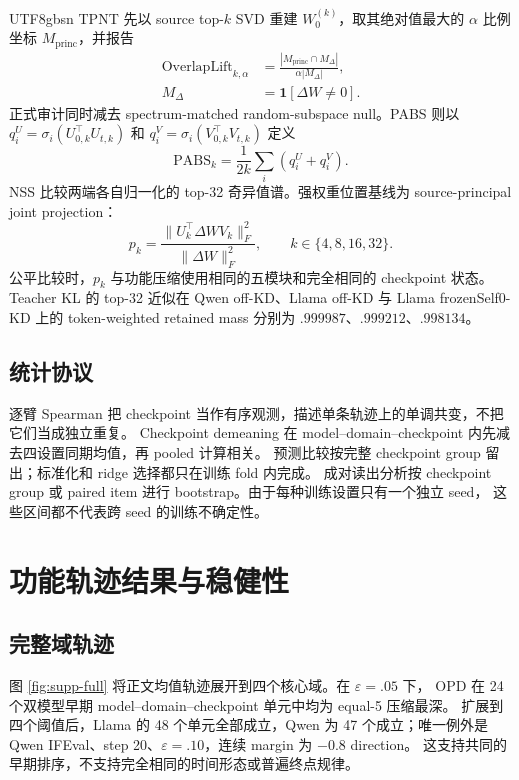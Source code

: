 \documentclass[letterpaper]{article} %
\begin{document}
\begin{CJK*}{UTF8}{gbsn}
TPNT 先以 source top-$k$ SVD 重建 $W_0^{(k)}$，取其绝对值最大的 $\alpha$ 比例坐标
$M_{\mathrm{princ}}$，并报告
\begin{equation}
\begin{aligned}
\mathrm{OverlapLift}_{k,\alpha}
&=\frac{|M_{\mathrm{princ}}\cap M_\Delta|}{\alpha|M_\Delta|},\\
M_\Delta&=\mathbf1[\Delta W\ne0].
\end{aligned}
\end{equation}
正式审计同时减去 spectrum-matched random-subspace null。PABS 则以
$q_i^U=\sigma_i(U_{0,k}^\top U_{t,k})$ 和
$q_i^V=\sigma_i(V_{0,k}^\top V_{t,k})$ 定义
\begin{equation}
\mathrm{PABS}_k=\frac{1}{2k}\sum_i(q_i^U+q_i^V).
\end{equation}
NSS 比较两端各自归一化的 top-32 奇异值谱。强权重位置基线为
source-principal joint projection：
\begin{equation}
p_k=\frac{\|U_k^\top\Delta W V_k\|_F^2}{\|\Delta W\|_F^2},
\qquad k\in\{4,8,16,32\}.
\end{equation}
公平比较时，$p_k$ 与功能压缩使用相同的五模块和完全相同的 checkpoint 状态。
Teacher KL 的 top-32 近似在 Qwen off-KD、Llama off-KD 与 Llama frozenSelf0-KD
上的 token-weighted retained mass 分别为 $.999987$、$.999212$、$.998134$。

\subsection{统计协议}

逐臂 Spearman 把 checkpoint 当作有序观测，描述单条轨迹上的单调共变，不把它们当成独立重复。
Checkpoint demeaning 在 model--domain--checkpoint 内先减去四设置同期均值，再 pooled 计算相关。
预测比较按完整 checkpoint group 留出；标准化和 ridge 选择都只在训练 fold 内完成。
成对读出分析按 checkpoint group 或 paired item 进行 bootstrap。由于每种训练设置只有一个独立 seed，
这些区间都不代表跨 seed 的训练不确定性。

\section{功能轨迹结果与稳健性}

\subsection{完整域轨迹}

图 \ref{fig:supp-full} 将正文均值轨迹展开到四个核心域。在 $\varepsilon=.05$ 下，
OPD 在 24 个双模型早期 model--domain--checkpoint 单元中均为 equal-5 压缩最深。
扩展到四个阈值后，Llama 的 48 个单元全部成立，Qwen 为 47 个成立；唯一例外是
Qwen IFEval、step 20、$\varepsilon=.10$，连续 margin 为 $-0.8$ direction。
这支持共同的早期排序，不支持完全相同的时间形态或普遍终点规律。


\end{CJK*}
\end{document}
